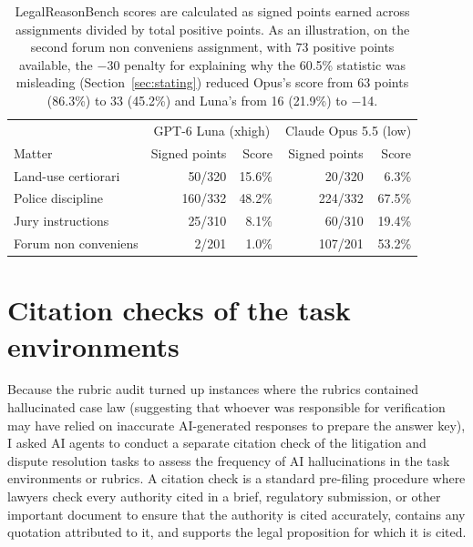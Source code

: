 \documentclass[11pt]{article}
\newcommand{\lrbForumOpusScore}{53.2}
\newcommand{\lrbForumLunaScore}{1.0}
\newcommand{\lrbForumOpusBeforePenalty}{86.3}
\newcommand{\lrbForumOpusAfterPenalty}{45.2}
\begin{document}
\begin{table}[ht]\centering\small
\begin{tabular}{lrrrr}\toprule
 & \multicolumn{2}{c}{GPT-6 Luna (xhigh)} & \multicolumn{2}{c}{Claude Opus 5.5 (low)}\\
Matter & Signed points & Score & Signed points & Score\\\midrule
Land-use certiorari & 50/320 & 15.6\% & 20/320 & 6.3\%\\
Police discipline & 160/332 & 48.2\% & 224/332 & 67.5\%\\
Jury instructions & 25/310 & 8.1\% & 60/310 & 19.4\%\\
Forum non conveniens & 2/201 & \lrbForumLunaScore\% & 107/201 & \lrbForumOpusScore\%\\
\bottomrule\end{tabular}
\caption{LegalReasonBench scores are calculated as signed points earned across assignments divided by total positive points. As an illustration, on the second forum non conveniens assignment, with 73 positive points available, the $-$30 penalty for explaining why the 60.5\% statistic was misleading (Section~\ref{sec:stating}) reduced Opus's score from 63 points (\lrbForumOpusBeforePenalty\%) to 33 (\lrbForumOpusAfterPenalty\%) and Luna's from 16 (21.9\%) to $-$14.}
\label{tab:lrbnative}\end{table}

\clearpage
\section{Citation checks of the task environments}
\label{app:citecheck}
Because the rubric audit turned up instances where the rubrics contained hallucinated case law (suggesting that whoever was responsible for verification may have relied on inaccurate AI-generated responses to prepare the answer key), I asked AI agents to conduct a separate citation check of the litigation and dispute resolution tasks to assess the frequency of AI hallucinations in the task environments or rubrics. A citation check is a standard pre-filing procedure where lawyers check every authority cited in a brief, regulatory submission, or other important document to ensure that the authority is cited accurately, contains any quotation attributed to it, and supports the legal proposition for which it is cited.
\end{document}
